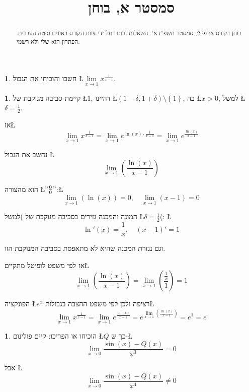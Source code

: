 \documentclass[english,hebrew]{article}
\theoremstyle{plain}
\theoremstyle{definition}
\newtheorem{problem}[thm]{\protect\problemname}
\theoremstyle{definition}
\newtheorem*{sol*}{\protect\solutionname}
\providecommand{\problemname}{בעיה}
\providecommand{\solutionname}{פתרון}
\begin{document}
\title{סמסטר {\endL}א, בוחן {\endL}}
\maketitle
\begin{abstract}
בוחן {\endL} בקורס אינפי 2, סמסטר תשפ”ז א’. השאלות נכתבו
על ידי צוות הקורס באוניברסיטה העברית. הפתרון הוא שלי ולא רשמי.
\end{abstract}
\begin{problem}
חשבו והוכיחו את הגבול \L{$\underset{x\rightarrow1}{\lim}x^{\frac{1}{x-1}}$}.
\end{problem}

\begin{sol*}
קיימת סביבה מנוקבת של \L{$1$}, דהיינו \L{$\left(1-\delta,1+\delta\right)\setminus\left\{ 1\right\} $},
בה \L{$x>0$}, למשל \L{$\delta=\frac{1}{2}$}.

אז\L{%
\[
\underset{x\rightarrow1}{\lim}x^{\frac{1}{x-1}}=\underset{x\rightarrow1}{\lim}e^{\ln\left(x\right)\cdot\frac{1}{x-1}}=\underset{x\rightarrow1}{\lim}e^{\frac{\ln\left(x\right)}{x-1}}
\]
}%

נחשב את הגבול \L{%
\[
\underset{x\rightarrow1}{\lim}\left(\frac{\ln\left(x\right)}{x-1}\right)
\]
}%

הוא מהצורה \L{$"\frac{0}{0}"$}:\L{%
\[
\underset{x\rightarrow1}{\lim}\left(\ln\left(x\right)\right)=0,\quad\underset{x\rightarrow1}{\lim}\left(x-1\right)=0
\]
}%

המונה והמכנה גזירים בסביבה מנוקבת של {\endL} )למשל \L{$\delta=\frac{1}{2}$}(:
\L{%
\[
\ln'(x)=\frac{1}{x},\quad\left(x-1\right)'=1
\]
}%

וגם נגזרת המכנה שהיא {\endL} לא מתאפסת בסביבה המנוקבת הזו. 

אז לפי משפט לופיטל מתקיים\L{%
\[
\underset{x\rightarrow1}{\lim}\left(\frac{\ln\left(x\right)}{x-1}\right)=\underset{x\rightarrow1}{\lim}\left(\frac{\frac{1}{x}}{1}\right)=1
\]
}%

הפונקציה \L{$e^{x}$} רציפה ולכן לפי משפט ההצבה בגבולות\L{%
\[
\underset{x\rightarrow1}{\lim}x^{\frac{1}{x-1}}=\underset{x\rightarrow1}{\lim}e^{\frac{\ln\left(x\right)}{x-1}}=e^{\underset{x\rightarrow1}{\lim}\left(\frac{\ln\left(x\right)}{x-1}\right)}=e^{1}=e
\]
}%

\newpage{}
\end{sol*}
\begin{problem}
הוכיחו או הפריכו: קיים פולינום \L{$Q$} כך ש-\L{%
\[
\underset{x\rightarrow0}{\lim}\frac{\sin\left(x\right)-Q\left(x\right)}{x^{3}}=0
\]
}%

אבל \L{%
\[
\underset{x\rightarrow0}{\lim}\frac{\sin\left(x\right)-Q\left(x\right)}{x^{4}}\ne0
\]
}%
\end{problem}
\end{document}
